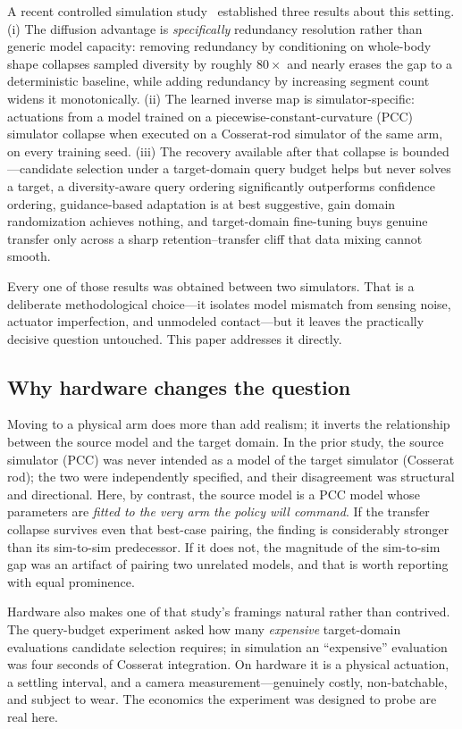 \documentclass[letterpaper, 10pt, conference]{ieeeconf}
\begin{document}
A recent controlled simulation study~\cite{prior} established three results
about this setting. (i) The diffusion advantage is \emph{specifically}
redundancy resolution rather than generic model capacity: removing redundancy
by conditioning on whole-body shape collapses sampled diversity by roughly
$80\times$ and nearly erases the gap to a deterministic baseline, while
adding redundancy by increasing segment count widens it monotonically. (ii)
The learned inverse map is simulator-specific: actuations from a model
trained on a piecewise-constant-curvature (PCC) simulator collapse when
executed on a Cosserat-rod simulator of the same arm, on every training seed.
(iii) The recovery available after that collapse is bounded---candidate
selection under a target-domain query budget helps but never solves a target,
a diversity-aware query ordering significantly outperforms confidence
ordering, guidance-based adaptation is at best suggestive, gain domain
randomization achieves nothing, and target-domain fine-tuning buys genuine
transfer only across a sharp retention--transfer cliff that data mixing
cannot smooth.

Every one of those results was obtained between two simulators. That is a
deliberate methodological choice---it isolates model mismatch from
sensing noise, actuator imperfection, and unmodeled contact---but it leaves
the practically decisive question untouched. This paper addresses it
directly.

\subsection*{Why hardware changes the question}

Moving to a physical arm does more than add realism; it inverts the
relationship between the source model and the target domain. In the prior
study, the source simulator (PCC) was never intended as a model of the target
simulator (Cosserat rod); the two were independently specified, and their
disagreement was structural and directional. Here, by contrast, the source
model is a PCC model whose parameters are \emph{fitted to the very arm the
policy will command}. If the transfer collapse survives even that
best-case pairing, the finding is considerably stronger than its sim-to-sim
predecessor. If it does not, the magnitude of the sim-to-sim gap was an
artifact of pairing two unrelated models, and that is worth reporting with
equal prominence.

Hardware also makes one of that study's framings natural rather than
contrived. The query-budget experiment asked how many \emph{expensive}
target-domain evaluations candidate selection requires; in simulation an
``expensive'' evaluation was four seconds of Cosserat integration. On
hardware it is a physical actuation, a settling interval, and a camera
measurement---genuinely costly, non-batchable, and subject to wear. The
economics the experiment was designed to probe are real here.
\end{document}
